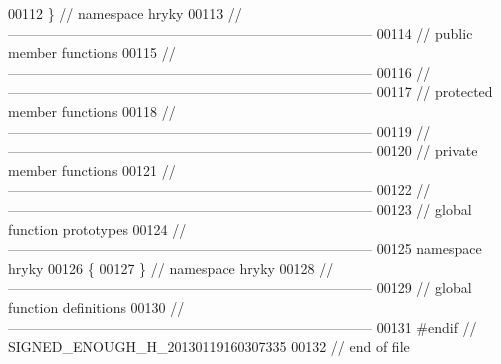 \begin{DoxyCode}
00112 \} \textcolor{comment}{// namespace hryky}
00113 \textcolor{comment}{//
      ------------------------------------------------------------------------------}
00114 \textcolor{comment}{// public member functions}
00115 \textcolor{comment}{//
      ------------------------------------------------------------------------------}
00116 \textcolor{comment}{//
      ------------------------------------------------------------------------------}
00117 \textcolor{comment}{// protected member functions}
00118 \textcolor{comment}{//
      ------------------------------------------------------------------------------}
00119 \textcolor{comment}{//
      ------------------------------------------------------------------------------}
00120 \textcolor{comment}{// private member functions}
00121 \textcolor{comment}{//
      ------------------------------------------------------------------------------}
00122 \textcolor{comment}{//
      ------------------------------------------------------------------------------}
00123 \textcolor{comment}{// global function prototypes}
00124 \textcolor{comment}{//
      ------------------------------------------------------------------------------}
00125 \textcolor{keyword}{namespace }hryky
00126 \{
00127 \} \textcolor{comment}{// namespace hryky}
00128 \textcolor{comment}{//
      ------------------------------------------------------------------------------}
00129 \textcolor{comment}{// global function definitions}
00130 \textcolor{comment}{//
      ------------------------------------------------------------------------------}
00131 \textcolor{preprocessor}{#endif // SIGNED\_ENOUGH\_H\_20130119160307335}
00132 \textcolor{preprocessor}{}\textcolor{comment}{// end of file}
\end{DoxyCode}
